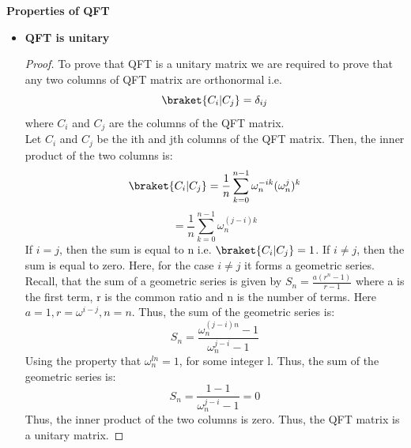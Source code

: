 \documentclass[12pt, oneside]{book}
\theoremstyle{definition}
\theoremstyle{definition}
\theoremstyle{remark}
\begin{document}
\textbf{Properties of QFT}
\begin{itemize}
    \item \textbf{QFT is unitary}
    \begin{proof} 
        To prove that QFT is a unitary matrix we are required to prove that any two columns of QFT matrix are orthonormal i.e. 
        \[ \braket{C_i|C_j}=\delta_{ij} \]
        where $C_i$ and $C_j$ are the columns of the QFT matrix.\\
        Let $C_i$ and $C_j$ be the ith and jth columns of the QFT matrix. Then, the inner product of the two columns is:
        \[ \braket{C_i|C_j}=\dfrac{1}{n}\sum_{k=0}^{n-1}\omega_n^{-ik}(\omega_n^{j})^k \]
        \[ =\dfrac{1}{n}\sum_{k=0}^{n-1}\omega_n^{(j-i)k} \]
        If $i=j$, then the sum is equal to n i.e. $\braket{C_i|C_j}=1$. If $i\neq j$, then the sum is equal to zero. 
        Here, for the case $i \neq j$ it forms a geometric series. Recall, that the sum of a geometric series is given by $S_n=\frac{a(r^n-1)}{r-1}$
        where a is the first term, r is the common ratio and n is the number of terms. Here $a=1, r =\omega^{i-j},n=n$. Thus, the sum of the geometric series is:
        \[ S_n=\dfrac{\omega_n^{(j-i)n}-1}{\omega_n^{j-i}-1} \]
        Using the property that $\omega_n^{ln}=1$, for some integer l. Thus, the sum of the geometric series is:
        \[ S_n=\dfrac{1-1}{\omega_n^{j-i}-1}=0 \]
        Thus, the inner product of the two columns is zero. Thus, the QFT matrix is a unitary matrix.


\end{proof}
\end{itemize}
\end{document}
